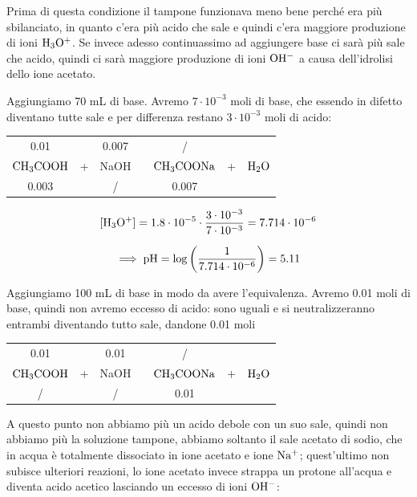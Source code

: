 Prima di questa condizione il tampone funzionava meno bene perché era più sbilanciato, in quanto c'era più acido che sale e quindi c'era maggiore produzione di ioni $\rm H_3O^+$. Se invece adesso continuassimo ad aggiungere base ci sarà più sale che acido, quindi ci sarà maggiore produzione di ioni $\rm OH^-$ a causa dell'idrolisi dello ione acetato.

Aggiungiamo 70 mL di base. Avremo $7 \cdot 10^{-3}$ moli di base, che essendo in difetto diventano tutte sale e per differenza restano $3 \cdot 10^{-3}$ moli di acido:

\begin{center}
    \begin{tabular}{ccccccc}
        0.01 &  & 0.007  & & / & &\\
        $\rm CH_3COOH$ & + & NaOH & \ce{->} & $\rm CH_3COONa$ & + & $\rm H_2O$\\
        0.003 &  &  / & & 0.007 & &\\
    \end{tabular}
\end{center}

$$\rm [H_3O^+]=1.8 \cdot 10^{-5} \cdot \frac{3 \cdot 10^{-3}}{7 \cdot 10^{-3}}=7.714 \cdot 10^{-6}$$

$$\implies \rm pH=\log{\left(\frac{1}{7.714 \cdot 10^{-6}}\right)}=5.11$$

Aggiungiamo 100 mL di base in modo da avere l'equivalenza. Avremo 0.01 moli di base, quindi non avremo eccesso di acido: sono uguali e si neutralizzeranno entrambi diventando tutto sale, dandone 0.01 moli

\begin{center}
    \begin{tabular}{ccccccc}
        0.01 &  & 0.01  & & / & &\\
        $\rm CH_3COOH$ & + & NaOH & \ce{->} & $\rm CH_3COONa$ & + & $\rm H_2O$\\
        / &  &  / & & 0.01 & &\\
    \end{tabular}
\end{center}

A questo punto non abbiamo più un acido debole con un suo sale, quindi non abbiamo più la soluzione tampone, abbiamo soltanto il sale acetato di sodio, che in acqua è totalmente dissociato in ione acetato e ione $\rm Na^+$; quest'ultimo non subisce ulteriori reazioni, lo ione acetato invece strappa un protone all'acqua e diventa acido acetico lasciando un eccesso di ioni $\rm OH^-$:

